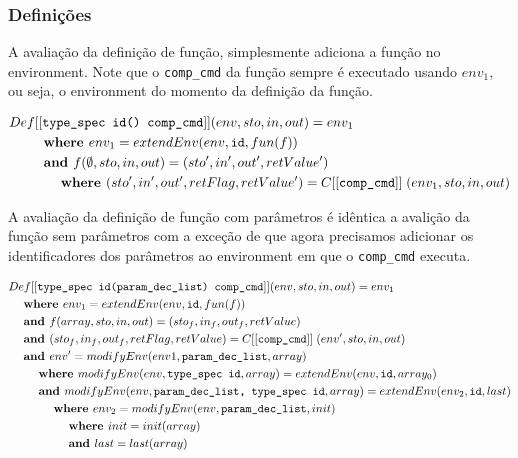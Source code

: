 \documentclass[12pt]{article}
\newcommand\eb[1]{[[\texttt{#1}]]}
\begin{document}
\subsubsection{Definições}

A avaliação da definição de função, simplesmente adiciona a função no environment. Note que o {\tt comp\_cmd} da função sempre é executado usando $env_1$, ou seja, o environment do momento da definição da função.

\begin{align*}
&Def\eb{type\_spec id() comp\_cmd} (env,sto,in,out) = env_1 \\
&\hspace{6ex}\textbf{where } env_1 = extendEnv(env, \texttt{id}, fun(f)) \\
&\hspace{6ex}\textbf{and } f(\emptyset, sto,in,out) = (sto', in', out', retValue') \\
&\hspace{9ex}\textbf{where }(sto',in',out',retFlag,retValue') = C\eb{comp\_cmd} \;(env_1,sto,in,out) \\
\end{align*}

A avaliação da definição de função com parâmetros é idêntica a avalição da função sem parâmetros com a exceção de que agora precisamos adicionar os identificadores dos parâmetros ao environment em que o {\tt comp\_cmd} executa.

\begin{align*}
&Def\eb{type\_spec id(param\_dec\_list) comp\_cmd} (env,sto,in,out) = env_1 \\
&\hspace{3ex}\textbf{where } env_1 = extendEnv(env, \texttt{id}, fun(f)) \\
&\hspace{3ex}\textbf{and } f(array,sto,in,out) = (sto_f,in_f,out_f,retValue) \\
&\hspace{3ex}\textbf{and } (sto_f,in_f,out_f,retFlag,retValue) = C\eb{comp\_cmd} \;(env',sto,in,out) \\
&\hspace{3ex}\textbf{and } env' = modifyEnv(env1, \texttt{param\_dec\_list}, array) \\
&\hspace{6ex}\textbf{where } modifyEnv(env, \texttt{type\_spec id}, array) = extendEnv(env, \texttt{id}, array_0) \\
&\hspace{6ex}\textbf{and } modifyEnv(env, \texttt{param\_dec\_list, type\_spec id}, array) = extendEnv(env_2, \texttt{id}, last) \\
&\hspace{9ex}\textbf{where } env_2 = modifyEnv(env, \texttt{param\_dec\_list}, init) \\
&\hspace{12ex}\textbf{where } init = init(array) \\
&\hspace{12ex}\textbf{and } last = last(array) \\
\end{align*}
\end{document}

